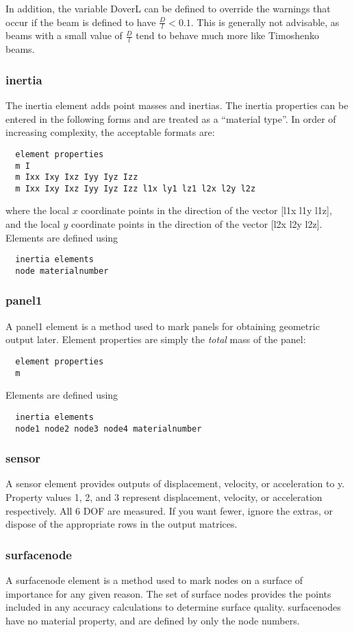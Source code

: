 \documentclass[12pt]{article}
\newcommand*{\command}[1]{\textsf{#1}}
\begin{document}
In addition, the variable \command{DoverL} can be defined to override the warnings that occur if the beam is defined to have  $\frac{D}{l}<0.1$. This is generally not advisable, as beams with a small value of $\frac{D}{l}$ tend to behave much more like Timoshenko beams. 



\subsubsection{\command{inertia}}\label{el:inertia}
The \command{inertia} element adds point masses and inertias.  The inertia properties can be entered in the following forms and are treated as a ``material type''.  In order of increasing complexity, the acceptable formats are:
\begin{lstlisting}
  element properties 
  m I 
  m Ixx Ixy Ixz Iyy Iyz Izz 
  m Ixx Ixy Ixz Iyy Iyz Izz l1x ly1 lz1 l2x l2y l2z
\end{lstlisting}
where the local $x$ coordinate points in the direction of the vector
[l1x l1y l1z], and the local $y$ coordinate points in the direction of
the vector [l2x l2y l2z]. Elements are defined using
\begin{lstlisting}
  inertia elements 
  node materialnumber
\end{lstlisting}
\subsubsection{\command{panel1}}
A \command{panel1} element is a method used to mark panels for obtaining geometric output later. Element properties are simply the \emph{total} mass of the panel:
\begin{lstlisting}
  element properties 
  m 
\end{lstlisting}
Elements are defined using
\begin{lstlisting}
  inertia elements 
  node1 node2 node3 node4 materialnumber
\end{lstlisting}
\subsubsection{\command{sensor}}
A \command{sensor} element provides outputs of displacement, velocity, or acceleration to \command{y}. Property values 1, 2, and 3 represent displacement, velocity, or acceleration respectively. All 6 DOF are measured. If you want fewer, ignore the extras, or dispose of the appropriate rows in the output matrices. 
\subsubsection{\command{surfacenode}}
A \command{surfacenode} element is a method used to mark nodes on a surface of importance for any given reason. The set of surface nodes provides the points included in any accuracy calculations to determine surface quality. \command{surfacenodes} have no material property, and are defined by only the node numbers.
\end{document}
